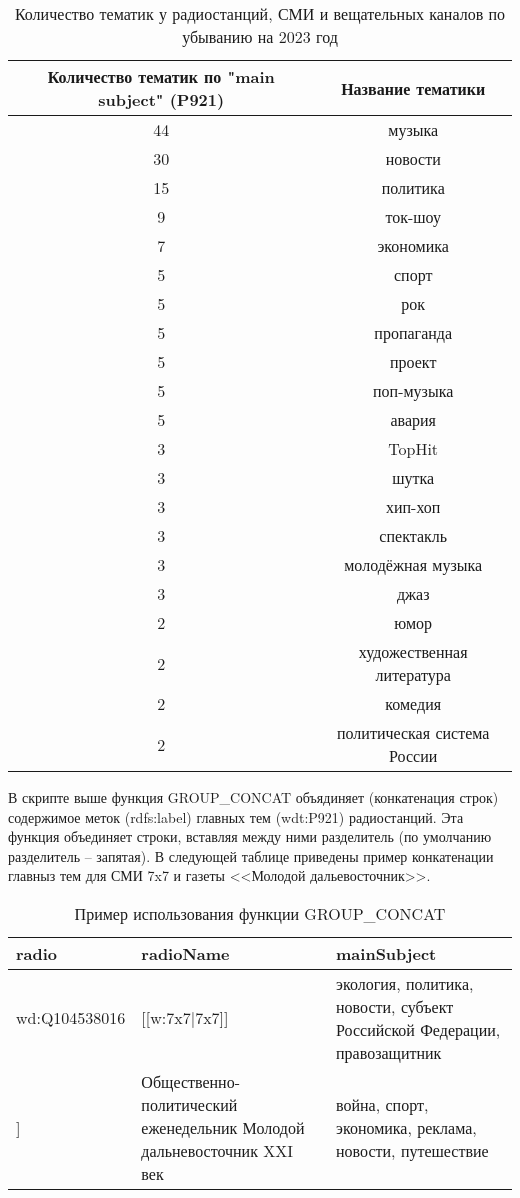 \begin{table}[ht]
\centering
\caption{Количество тематик у радиостанций, СМИ и вещательных каналов по убыванию на 2023 год}
\begin{tabular}{|c|c|}
\hline
Количество тематик по "main subject" (P921) & Название тематики \\
\hline
44 & музыка \\
30 & новости \\
15 & политика \\
9 & ток-шоу \\
7 & экономика \\
5 & спорт \\
5 & рок \\
5 & пропаганда \\
5 & проект \\
5 & поп-музыка \\
5 & авария \\
3 & TopHit \\
3 & шутка \\
3 & хип-хоп \\
3 & спектакль \\
3 & молодёжная музыка \\
3 & джаз \\
2 & юмор \\
2 & художественная литература \\
2 & комедия \\
2 & политическая система России \\
\hline
\end{tabular}
\end{table}

\newpage

В скрипте выше функция GROUP\_CONCAT объядиняет (конкатенация строк) содержимое меток (rdfs:label) главных тем (wdt:P921) радиостанций. Эта функция объединяет строки, вставляя между ними разделитель (по умолчанию разделитель -- запятая). В следующей таблице приведены пример конкатенации главныз тем для СМИ 7x7 и газеты <<Молодой дальевосточник>>.

\begin{table}[ht]
\centering
\caption{Пример использования функции GROUP\_CONCAT}
\begin{tabular}{|p{14em}|p{10em}|p{10em}|}
\hline
radio & radioName & mainSubject \\
\hline
wd:Q104538016 & [[w:7x7|7x7]] & экология, политика, новости, субъект Российской Федерации, правозащитник \\
\hline
[[d:Q30909585|wd:Q30909585]] & Общественно-политический еженедельник Молодой дальневосточник XXI век & война, спорт, экономика, реклама, новости, путешествие \\
\hline
\end{tabular}
\end{table}


